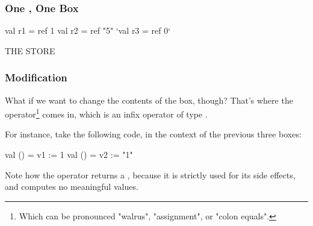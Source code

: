 \documentclass[aspectratio=169, handout]{beamer}
\begin{document}
\begin{frame}[fragile]
  \frametitle{One , One Box}

  \begin{center}
    \begin{minipage}[t][2.5in][t]{0.55\textwidth}
      \vspace{\fill}
      \begin{codeblock}
        val r1 = ref 1
        val r2 = ref "5"
        `val r3 = ref 0`
      \end{codeblock}
      \vspace{\fill}
    \end{minipage}
    \hfill\vline\hfill
    \begin{minipage}[t][2.5in][t]{0.35\textwidth}
      \centering
      {\hspace{-20pt}\color{gray} \large THE STORE}

      \vspace{\fill}
      \vspace{\fill}
    \end{minipage}
  \end{center}
\end{frame}

\begin{frame}[fragile]
  \frametitle{ Modification}

  What if we want to change the contents of the box, though? That's where the
  \code{:=} operator\footnote{Which can be pronounced "walrus", "assignment", or "colon equals".}
  comes in, which is an infix operator of type .

  \pause
  \vspace{\fill}

  For instance, take the following code, in the context of the previous three boxes:
  \begin{codeblock}
    val () = v1 := 1
    val () = v2 := "1"
  \end{codeblock}

  \pause
  \vspace{\fill}

  Note how the \code{:=} operator returns a \code{()}, because it is strictly used
  for its side effects, and computes no meaningful values.
\end{frame}
\end{document}
